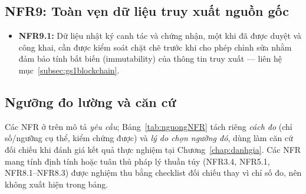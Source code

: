 \subsection{NFR9: Toàn vẹn dữ liệu truy xuất nguồn gốc}
\begin{itemize}
    \item \textbf{NFR9.1:} Dữ liệu nhật ký canh tác và chứng nhận, một khi
    đã được duyệt và công khai, cần được kiểm soát chặt chẽ trước khi cho
    phép chỉnh sửa nhằm đảm bảo tính bất biến (immutability) của thông tin
    truy xuất --- liên hệ mục~\ref{subsec:gs1blockchain}.
\end{itemize}

\subsection{Ngưỡng đo lường và căn cứ}
\label{subsec:nguongNFR}

Các NFR ở trên mô tả \textit{yêu cầu}; Bảng~\ref{tab:nguongNFR} tách riêng
\textit{cách đo} (chỉ số/ngưỡng cụ thể, kiểm chứng được) và \textit{lý do
chọn ngưỡng đó}, dùng làm căn cứ đối chiếu khi đánh giá kết quả thực nghiệm
tại Chương~\ref{chap:danhgia}. Các NFR mang tính định tính hoặc tuân thủ
pháp lý thuần túy (NFR3.4, NFR5.1, NFR8.1--NFR8.3) được nghiệm thu bằng
checklist đối chiếu thay vì chỉ số đo, nên không xuất hiện trong bảng.

